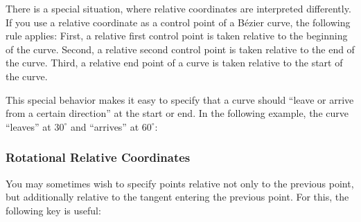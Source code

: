 There is a special situation, where relative coordinates are
interpreted differently. If you use a relative coordinate as a control
point of a B\'ezier curve, the following rule applies: First, a relative
first control point is taken relative to the beginning of the
curve. Second, a relative second control point is taken relative to
the end of the curve. Third, a relative end point of a curve is taken
relative to the start of the curve.

This special behavior makes it easy to specify that a curve should
``leave or arrive from a certain direction'' at the start or end. In
the following example, the curve ``leaves'' at $30^\circ$ and
``arrives'' at $60^\circ$:

\begin{codeexample}[]
\end{codeexample}


\subsubsection{Rotational Relative Coordinates}

You may sometimes wish to specify points relative not only to the
previous point, but additionally relative to the tangent entering the
previous point. For this, the following key is useful:

